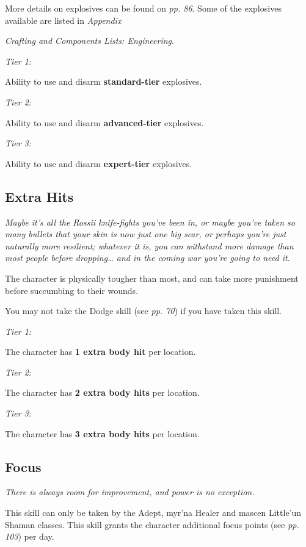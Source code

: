 \documentclass{scrbook}
\begin{document}
More details on explosives can be found on \textit{pp. 86}. Some of the explosives available are listed in \textit{Appendix}

\textit{Crafting and Components Lists: Engineering}.

\textit{Tier 1:}

Ability to use and disarm \textbf{standard-tier} explosives.

\textit{Tier 2:}

Ability to use and disarm \textbf{advanced-tier} explosives.

\textit{Tier 3:}

Ability to use and disarm \textbf{expert-tier} explosives.

\subsection{Extra Hits}

\textit{Maybe it's all the Rossii knife-fights you've been in, or maybe you've taken so many bullets that your skin is now just one big scar, or perhaps you're just naturally more resilient; whatever it is, you can withstand more damage than most people before dropping{\dots} and in the coming war you're going to need it.}

The character is physically tougher than most, and can take more punishment before succumbing to their wounds.

You may not take the Dodge skill (see \textit{pp. 70}) if you have taken this skill.

\textit{Tier 1:}

The character has \textbf{1 extra body hit} per location.

\textit{Tier 2:}

The character has \textbf{2 extra body hits} per location.

\textit{Tier 3:}

The character has \textbf{3 extra body hits} per location.

\subsection{Focus}

\textit{There is always room for improvement, and power is no exception.}

This skill can only be taken by the Adept, myr'na Healer and mascen Little'un Shaman classes. This skill grants the character additional focus points (see \textit{pp. 103}) per day.
\end{document}
